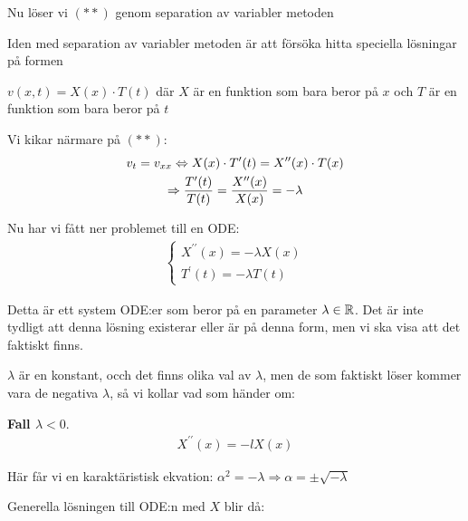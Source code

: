 \par\bigskip
\noindent Nu löser vi $(**)$ genom separation av variabler metoden
\par\bigskip
\noindent Iden med separation av variabler metoden är att försöka hitta speciella lösningar på formen\par\noindent $v(x,t) = X(x)\cdot T(t)$ där $X$ är en funktion som bara beror på $x$ och $T$ är en funktion som bara beror på $t$
\par\bigskip
\noindent Vi kikar närmare på $(**)$:
\begin{equation*}
  \begin{gathered}
    v_t = v_{xx}\Leftrightarrow X(x)\cdot T^{\prime}(t) = X^{\prime\prime}(x)\cdot T(x)\\
    \Rightarrow \dfrac{T^{\prime}(t)}{T(t)} = \dfrac{X^{\prime\prime}(x)}{X(x)} = -\lambda
  \end{gathered}
\end{equation*}
\par\bigskip
\noindent Nu har vi fått ner problemet till en ODE:
\begin{equation*}
  \begin{gathered}
    \begin{cases*}
      X^{\prime\prime}(x) = -\lambda X(x)\\
      T^{\prime}(t) = -\lambda T(t)
    \end{cases*}
  \end{gathered}
\end{equation*}\par
\noindent Detta är ett system ODE:er som beror på en parameter $\lambda\in\mathbb{R}$. Det är inte tydligt att denna lösning existerar eller är på denna form, men vi ska visa att det faktiskt finns. \par
\par\bigskip
\noindent $\lambda$ är en konstant, occh det finns olika val av $\lambda$, men de som faktiskt löser kommer vara de negativa $\lambda$, så vi kollar vad som händer om:
\par\bigskip
\noindent\textbf{Fall $\lambda<0$}.
\begin{equation*}
  \begin{gathered}
    X^{\prime\prime}(x) = -lX(x)
  \end{gathered}
\end{equation*}\par
\noindent Här får vi en karaktäristisk ekvation: $\alpha^2=-\lambda\Rightarrow\alpha = \pm\sqrt{-\lambda}$\par
\noindent Generella lösningen till ODE:n med $X$ blir då:
